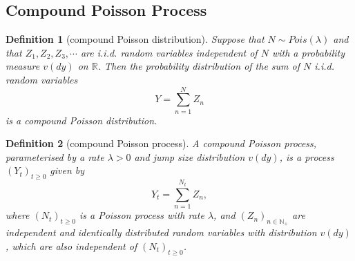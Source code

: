 \documentclass{article}
\newtheorem{definition}{Definition}[section]
\theoremstyle{nonumberplain}
\begin{document}
\subsection{Compound Poisson Process}
\begin{definition}[compound Poisson distribution]
	Suppose that
	$N\sim Pois(\lambda )$ and that $Z_{1},Z_{2},Z_{3},\cdots $ are i.i.d. random variables independent of $N$ with a probability measure $v(dy)$ on $\mathbb{R}$. Then the probability distribution of the sum of $N$ i.i.d. random variables
	\[
	Y=\sum _{n=1}^{N}Z_{n}
	\]
	is a \emph{compound Poisson distribution}.
\end{definition}


\begin{definition}[compound Poisson process]
	\emph{A compound Poisson process}, parameterised by a rate $\lambda >0$ and jump size distribution $v(dy)$, is a process $(Y_t)_{t\ge 0}$ given by
	\[
	Y_t=\sum _{n=1}^{N_t}Z_{n},
	\]
	where $(N_t)_{t\ge 0}$ is a Poisson process with rate $\lambda$, and $(Z_n)_{n\in \mathbb{N}_+}$ are independent and identically distributed random variables with distribution $v(dy)$, which are also independent of $(N_t)_{t\ge 0}$.
\end{definition}
\end{document}
